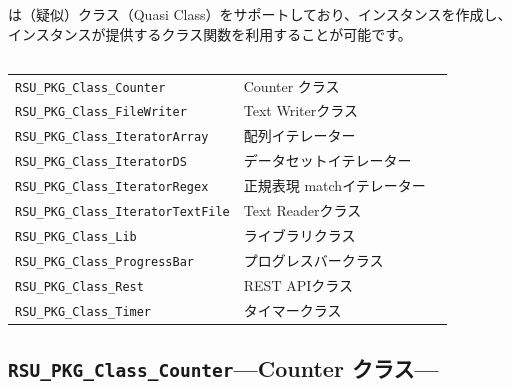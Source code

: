 \chapter{\DocStrTitleRDMQuasiClassDetails}
\RDM は（疑似）クラス（Quasi Class）をサポートしており、インスタンスを作成し、インスタンスが提供するクラス関数を利用することが可能です。
\section{\DocStrTitleRDMClassList}
\begin{center}
{\footnotesize
\begin{xltabular}{\textwidth}{|p{5truecm}|X|p{2.5truecm}|}
\hline
\thead{\DocStrHeaderClassName}&\thead{\DocStrHeaderClassPurpose}&\thead{\DocStrRefto}\\
\hline
\hline
\texttt{RSU\_PKG\_Class\_Counter}&Counter クラス&\\
\hline
\texttt{RSU\_PKG\_Class\_FileWriter}&Text Writerクラス&\\
\hline
\texttt{RSU\_PKG\_Class\_IteratorArray}&配列イテレーター&\\
\hline
\texttt{RSU\_PKG\_Class\_IteratorDS}&データセットイテレーター&\\
\hline
\texttt{RSU\_PKG\_Class\_IteratorRegex}&正規表現 matchイテレーター&\\
\hline
\texttt{RSU\_PKG\_Class\_IteratorTextFile}&Text Readerクラス&\\
\hline
\texttt{RSU\_PKG\_Class\_Lib}&ライブラリクラス&\\
\hline
\texttt{RSU\_PKG\_Class\_ProgressBar}&プログレスバークラス&\\
\hline
\texttt{RSU\_PKG\_Class\_Rest}&REST APIクラス&\\
\hline
\texttt{RSU\_PKG\_Class\_Timer}&タイマークラス&\\
\hline
\end{xltabular}
}
\end{center}
 
\section{\texttt{RSU\_PKG\_Class\_Counter}\;---\;Counter クラス\;---}\label{sec:RSU_PKG_Class_Counter}
